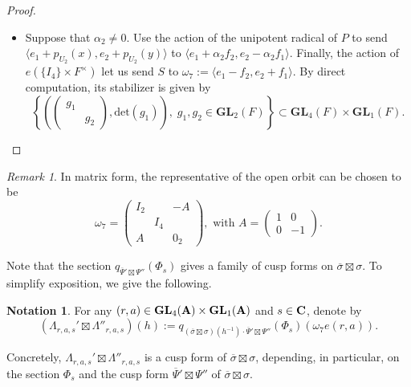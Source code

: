 \documentclass[11pt, reqno]{amsart}
\theoremstyle{plain}
\theoremstyle{definition}
\newtheorem{notation}[theorem]{Notation}
\theoremstyle{remark}
\newtheorem{remark}[theorem]{Remark}
\theoremstyle{plain}
\def\C{{\bf C}}
\def\A{{\bf A}}
\def\GL{\mathbf{GL}}
\begin{document}
\begin{proof}
\begin{itemize}
    \item Suppose that $\alpha_2 \ne 0$. Use the action of the unipotent radical of $P$ to send $\langle e_1+p_{U_2}(x), e_2 +p_{U_2}(y)\rangle$ to $ \langle e_1 +  \alpha_2 f_2, e_2 -\alpha_2 f_1\rangle$. Finally, the action of $e(\{ I_4\} \times F^\times)$ let us send $S$ to $\omega_7 :=\langle e_1 - f_2, e_2 + f_1 \rangle $. By direct computation, its stabilizer is given by \[\left\{\left(\left(\begin{smallmatrix}g_1& \\ &g_2\end{smallmatrix}\right),\mathrm{det}(g_1)\right),\;g_1,g_2\in \GL_2(F)\right\}\subset \GL_4(F)\times \GL_1(F).\]
    \end{itemize}
\end{proof}
\begin{remark}
In matrix form, the representative of the open orbit can be chosen to be
\[\omega_7 =\left(\begin{smallmatrix}
I_2 &  &  -A \\
 & I_4 &  \\
A & &  0_2
\end{smallmatrix}\right), \text{ with } A =\left(\begin{smallmatrix} 1 & 0 \\ 0 & -1 
\end{smallmatrix}\right).\] 
\end{remark}

Note that the section $q_{\overline{\Psi}'\boxtimes\Psi''}(\Phi_{s})$ gives a family of cusp forms on $ \overline{\sigma}\boxtimes \sigma$. To simplify exposition, we give the following.
\begin{notation}
   For any $(r,a) \in \GL_4(\A) \times \GL_1(\A)$ and $s \in \C$, denote by  \[(\Lambda_{r,a,s}'\boxtimes\Lambda''_{r,a,s})(h) := q_{(\overline{\sigma} \boxtimes \sigma)(h^{-1})\cdot\overline{\Psi}'\boxtimes\Psi''}(\Phi_{s})(\omega_7e(r,a)).\] 
   \end{notation}
Concretely, $\Lambda_{r,a,s}'\boxtimes\Lambda''_{r,a,s}$ is a cusp form of $\overline{\sigma} \boxtimes  \sigma$, depending, in particular, on the section $\Phi_s$ and the cusp form $\overline{\Psi}'\boxtimes\Psi''$ of $\overline{\sigma} \boxtimes  \sigma$.
\end{document}
